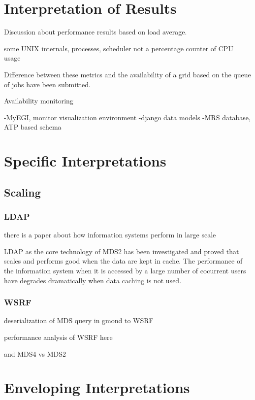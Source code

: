 \section{Interpretation of Results}


Discussion about performance results based on
load average.

some UNIX internals, processes, scheduler
not a percentage counter of CPU usage


Difference between these metrics and the availability of 
a grid based on the queue of jobs have been submitted.

Availability monitoring

-MyEGI, monitor visualization environment
-django data models
-MRS database, ATP based schema


\section{Specific Interpretations}

\subsection{Scaling}
\subsubsection{LDAP}

there is a paper about how information systems perform in large scale

LDAP as the core technology of MDS2 has been investigated \cite{zhang2004performance} and proved that scales and performs good when the data are kept in cache. The performance of the information system when it is accessed by a large number of cocurrent users have degrades dramatically when data caching is not used.

\subsubsection{WSRF}
deserialization of MDS query in gmond to WSRF

performance analysis of WSRF here \cite{schopf2006monitoring}

and MDS4 vs MDS2

\section{Enveloping Interpretations}
